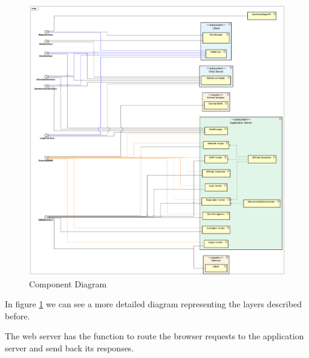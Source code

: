 \documentclass[table, 12pt]{article}
\begin{document}
\begin{figure}[H]
    \begin{center}
        \includegraphics[width=\textwidth]{assets/Architectural-Design/ComponentDiagram.png}
        \caption{Component Diagram}
        \label{component_diagram}
    \end{center}
\end{figure}

In figure \ref{component_diagram} we can see a more detailed diagram representing the layers described before.

The web server has the function to route the browser requests to the application server and send back its responses.
\end{document}
